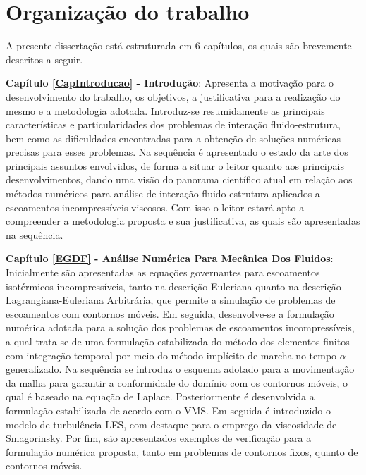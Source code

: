 \section{Organização do trabalho}

A presente dissertação está estruturada em 6 capítulos, os quais são brevemente descritos a seguir.

    {
        \newcommand{\Capi}[2]{\textbf{Capítulo #1 - #2}:}

        \Capi{\ref{CapIntroducao}}{Introdução} Apresenta a motivação para o desenvolvimento do trabalho, os objetivos, a justificativa para a realização do mesmo e a metodologia adotada. Introduz-se resumidamente as principais características e particularidades dos problemas de interação fluido-estrutura, bem como as dificuldades encontradas para a obtenção de soluções numéricas precisas para esses problemas. Na sequência é apresentado o estado da arte dos principais assuntos envolvidos, de forma a situar o leitor quanto aos principais desenvolvimentos, dando uma visão do panorama científico atual em relação aos métodos numéricos para análise de interação fluido estrutura aplicados a escoamentos incompressíveis viscosos. Com isso o leitor estará apto a compreender a metodologia proposta e sua justificativa, as quais são apresentadas na sequência.

        \Capi{\ref{EGDF}}{Análise Numérica Para Mecânica Dos Fluidos} Inicialmente são apresentadas as equações governantes para escoamentos isotérmicos incompressíveis, tanto na descrição Euleriana quanto na descrição Lagrangiana-Euleriana Arbitrária, que permite a simulação de problemas de escoamentos com contornos móveis. Em seguida, desenvolve-se a formulação numérica adotada para a solução dos problemas de escoamentos incompressíveis, a qual trata-se de uma formulação estabilizada do método dos elementos finitos com integração temporal por meio do método implícito de marcha no tempo $\alpha$-generalizado. Na sequência se introduz o esquema adotado para a movimentação da malha para garantir a conformidade do domínio com os contornos móveis, o qual é baseado na equação de Laplace. Posteriormente é desenvolvida a formulação estabilizada de acordo com o VMS. Em seguida é introduzido o modelo de turbulência LES, com destaque para o emprego da viscosidade de Smagorinsky. Por fim, são apresentados exemplos de verificação para a formulação numérica proposta, tanto em problemas de contornos fixos, quanto de contornos móveis.

}
